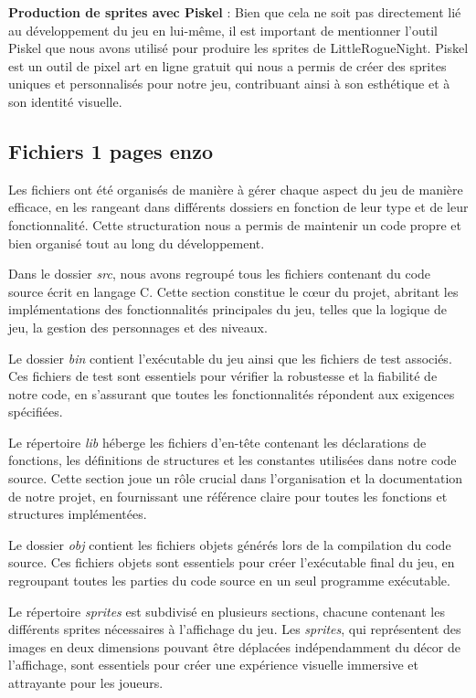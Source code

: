 \documentclass[10pt]{article}
\begin{document}
\textbf{Production de sprites avec Piskel} :
Bien que cela ne soit pas directement lié au développement du jeu en lui-même, il est important de mentionner l'outil Piskel que nous avons utilisé pour produire les sprites de LittleRogueNight. Piskel est un outil de pixel art en ligne gratuit qui nous a permis de créer des sprites uniques et personnalisés pour notre jeu, contribuant ainsi à son esthétique et à son identité visuelle.


\subsection{Fichiers 1 pages enzo}

Les fichiers ont été organisés de manière à gérer chaque aspect du jeu de manière efficace, en les rangeant dans différents dossiers en fonction de leur type et de leur fonctionnalité. Cette structuration nous a permis de maintenir un code propre et bien organisé tout au long du développement.

Dans le dossier \textit{src}, nous avons regroupé tous les fichiers contenant du code source écrit en langage C. Cette section constitue le cœur du projet, abritant les implémentations des fonctionnalités principales du jeu, telles que la logique de jeu, la gestion des personnages et des niveaux.

Le dossier \textit{bin} contient l'exécutable du jeu ainsi que les fichiers de test associés. Ces fichiers de test sont essentiels pour vérifier la robustesse et la fiabilité de notre code, en s'assurant que toutes les fonctionnalités répondent aux exigences spécifiées.

Le répertoire \textit{lib} héberge les fichiers d'en-tête contenant les déclarations de fonctions, les définitions de structures et les constantes utilisées dans notre code source. Cette section joue un rôle crucial dans l'organisation et la documentation de notre projet, en fournissant une référence claire pour toutes les fonctions et structures implémentées.

Le dossier \textit{obj} contient les fichiers objets générés lors de la compilation du code source. Ces fichiers objets sont essentiels pour créer l'exécutable final du jeu, en regroupant toutes les parties du code source en un seul programme exécutable.

Le répertoire \textit{sprites} est subdivisé en plusieurs sections, chacune contenant les différents sprites nécessaires à l'affichage du jeu. Les \textit{\gls{sprites}}, qui représentent des images en deux dimensions pouvant être déplacées indépendamment du décor de l'affichage, sont essentiels pour créer une expérience visuelle immersive et attrayante pour les joueurs.
\end{document}
